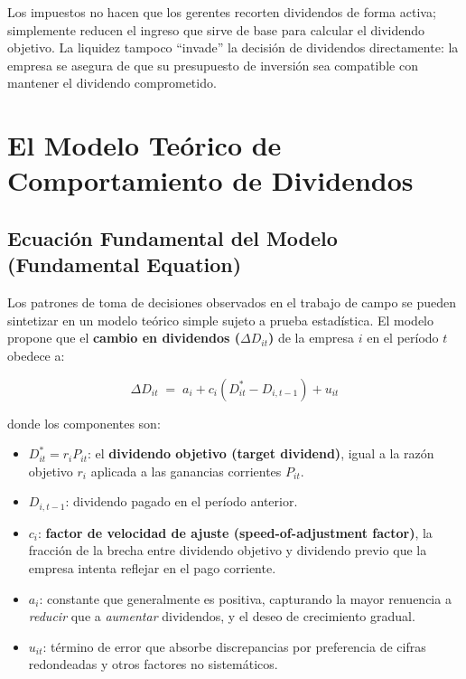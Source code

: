 \documentclass[12pt]{article}
\begin{document}
\begin{intuicion}
Los impuestos no hacen que los gerentes recorten dividendos de forma activa; simplemente
reducen el ingreso que sirve de base para calcular el dividendo objetivo. La liquidez tampoco
``invade'' la decisi\'on de dividendos directamente: la empresa se asegura de que su
presupuesto de inversi\'on sea compatible con mantener el dividendo comprometido.
\end{intuicion}

\section{El Modelo Te\'orico de Comportamiento de Dividendos}

\subsection{Ecuaci\'on Fundamental del Modelo (Fundamental Equation)}

Los patrones de toma de decisiones observados en el trabajo de campo se pueden sintetizar en
un modelo te\'orico simple sujeto a prueba estad\'istica. El modelo propone que el
\textbf{cambio en dividendos ($\Delta D_{it}$)} de la empresa $i$ en el per\'iodo $t$
obedece a:

\begin{equation}
  \Delta D_{it} \;=\; a_i + c_i\!\left(D^*_{it} - D_{i,t-1}\right) + u_{it}
\end{equation}

donde los componentes son:

\begin{itemize}
  \item $D^*_{it} = r_i P_{it}$: el \textbf{dividendo objetivo (target dividend)}, igual a la
        raz\'on objetivo $r_i$ aplicada a las ganancias corrientes $P_{it}$.
  \item $D_{i,t-1}$: dividendo pagado en el per\'iodo anterior.
  \item $c_i$: \textbf{factor de velocidad de ajuste (speed-of-adjustment factor)}, la
        fracci\'on de la brecha entre dividendo objetivo y dividendo previo que la empresa
        intenta reflejar en el pago corriente.
  \item $a_i$: constante que generalmente es positiva, capturando la mayor renuencia a
        \textit{reducir} que a \textit{aumentar} dividendos, y el deseo de crecimiento gradual.
  \item $u_{it}$: t\'ermino de error que absorbe discrepancias por preferencia de cifras
        redondeadas y otros factores no sistem\'aticos.
\end{itemize}
\end{document}
